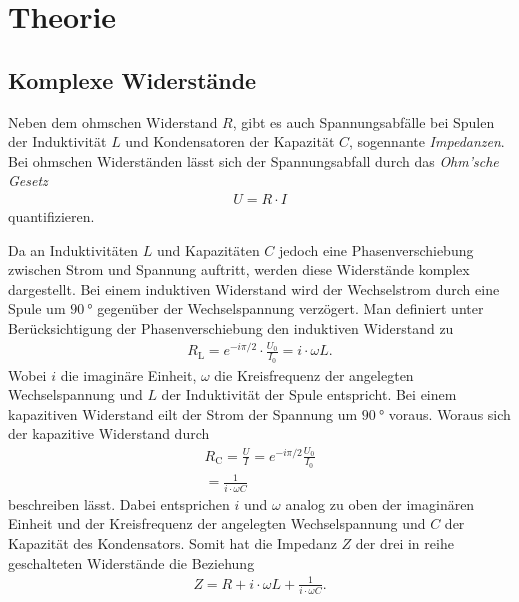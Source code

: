 \section{Theorie}
\label{sec:Theorie}

\subsection{Komplexe Widerstände}

Neben dem ohmschen Widerstand $R$, gibt es auch Spannungsabfälle bei Spulen der Induktivität $L$ und Kondensatoren der Kapazität $C$, 
sogennante \textit{Impedanzen}. Bei ohmschen Widerständen lässt sich der Spannungsabfall durch das \textit{Ohm'sche Gesetz} 
\begin{align*}
    U = R \cdot I    
\end{align*}
quantifizieren.

Da an Induktivitäten $L$ und Kapazitäten $C$ jedoch eine Phasenverschiebung zwischen Strom und Spannung auftritt, werden diese Widerstände
komplex dargestellt. Bei einem induktiven Widerstand wird der Wechselstrom durch eine Spule um $\SI{90}{\degree}$ gegenüber der 
Wechselspannung verzögert. Man definiert unter Berücksichtigung der Phasenverschiebung den induktiven Widerstand zu
\begin{align*}
    R_{\text{L}} = e^{-i\pi/2}\cdot\frac{U_0}{I_0} = i\cdot\omega L.
\end{align*}
Wobei $i$ die imaginäre Einheit, $\omega$ die Kreisfrequenz der angelegten Wechselspannung und $L$ der Induktivität der Spule entspricht.
Bei einem kapazitiven Widerstand eilt der Strom der Spannung um $\SI{90}{\degree}$ voraus. Woraus sich der kapazitive Widerstand durch
\begin{align*}
    R_{\text{C}} = \frac UI = e^{-i\pi/2} \frac{U_0}{I_0} \\
    = \frac{1}{i\cdot\omega C}
\end{align*}
beschreiben lässt. Dabei entsprichen $i$ und $\omega$ analog zu oben der imaginären Einheit und der Kreisfrequenz der angelegten 
Wechselspannung und $C$ der Kapazität des Kondensators.
Somit hat die Impedanz $Z$ der drei in reihe geschalteten Widerstände die Beziehung
\begin{align}
    \label{eqn:impedanz}
    Z = R + i\cdot\omega L + \frac{1}{i\cdot\omega C}.
\end{align}


